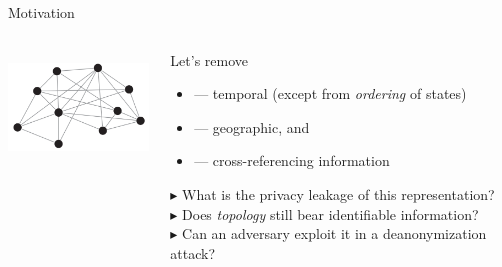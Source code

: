 \documentclass[hyperref={colorlinks = true},unknownkeysallowed]{beamer}
\begin{document}
\begin{frame}{Motivation}
	\begin{columns}
		\begin{column}[t]{0.35\textwidth}
			\begin{center}
			\centering	\includegraphics[width=4cm,height=3cm]{figs/mobility_network.png}\\[.5\baselineskip]
		\end{center}
	\begin{center}
\end{center}
		\end{column}
		\begin{column}[t]{0.65\textwidth}
			\begin{block}{Let's remove}
				\begin{itemize}
					\item --- temporal (except from \emph{ordering} of states)
					\item --- geographic, and
					\item --- cross-referencing information
				\end{itemize}
			\end{block}
			\pause
			\begin{block}{$\blacktriangleright$ What is the privacy leakage of this representation? \\ 
									$\blacktriangleright$ Does \emph{topology} still bear identifiable information? \\
									$\blacktriangleright$ Can an adversary exploit it in a deanonymization attack? }
			\end{block}
		\end{column}
	\end{columns}
\end{frame}
\end{document}
